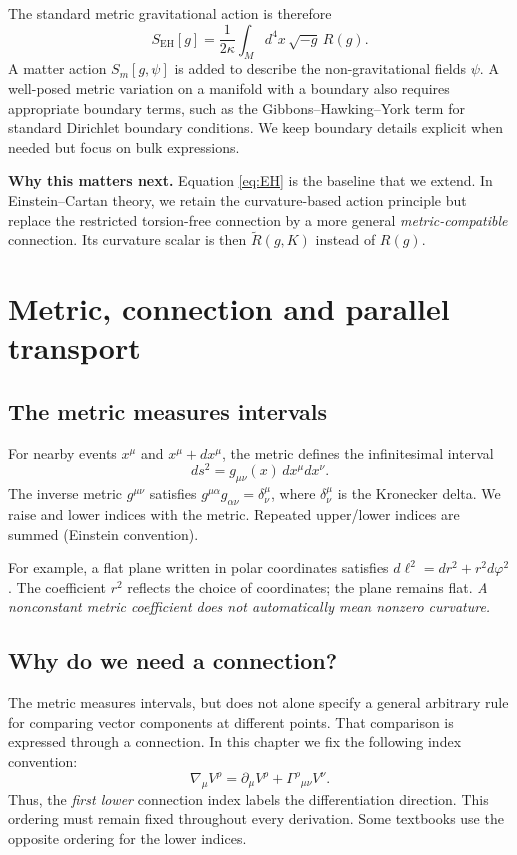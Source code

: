 \documentclass[11pt,a4paper]{article}
\begin{document}
The standard metric gravitational action is therefore
\begin{equation}\label{eq:EH}
\boxed{S_{\mathrm{EH}}[g]=\frac1{2\kappa}\int_M d^4x\,\sqrt{-g}\,R(g).}
\end{equation}
A matter action $S_m[g,\psi]$ is added to describe the non-gravitational fields $\psi$. A well-posed metric variation on a manifold with a boundary also requires appropriate boundary terms, such as the Gibbons--Hawking--York term for standard Dirichlet boundary conditions. We keep boundary details explicit when needed but focus on bulk expressions.

\begin{whybox}\textbf{Why this matters next.} Equation \eqref{eq:EH} is the baseline that we extend. In Einstein--Cartan theory, we retain the curvature-based action principle but replace the restricted torsion-free connection by a more general \emph{metric-compatible} connection. Its curvature scalar is then $\widetilde R(g,K)$ instead of $R(g)$.\end{whybox}

\section{Metric, connection and parallel transport}
\subsection{The metric measures intervals}
For nearby events $x^\mu$ and $x^\mu+dx^\mu$, the metric defines the infinitesimal interval
\begin{equation}\label{eq:metric}
\boxed{ds^2=g_{\mu\nu}(x)\,dx^\mu dx^\nu.}
\end{equation}
The inverse metric $g^{\mu\nu}$ satisfies $g^{\mu\alpha}g_{\alpha\nu}=\delta^\mu_\nu$, where $\delta^\mu_\nu$ is the Kronecker delta. We raise and lower indices with the metric. Repeated upper/lower indices are summed (Einstein convention).

For example, a flat plane written in polar coordinates satisfies $d\ell^2=dr^2+r^2d\varphi^2$. The coefficient $r^2$ reflects the choice of coordinates; the plane remains flat. \emph{A nonconstant metric coefficient does not automatically mean nonzero curvature.}

\subsection{Why do we need a connection?}
The metric measures intervals, but does not alone specify a general arbitrary rule for comparing vector components at different points. That comparison is expressed through a connection. In this chapter we fix the following index convention:
\begin{equation}\label{eq:convention}
\boxed{\nabla_\mu V^\rho=\partial_\mu V^\rho+\Gamma^\rho{}_{\mu\nu}V^\nu.}
\end{equation}
Thus, the \emph{first lower} connection index labels the differentiation direction. This ordering must remain fixed throughout every derivation. Some textbooks use the opposite ordering for the lower indices.
\end{document}
